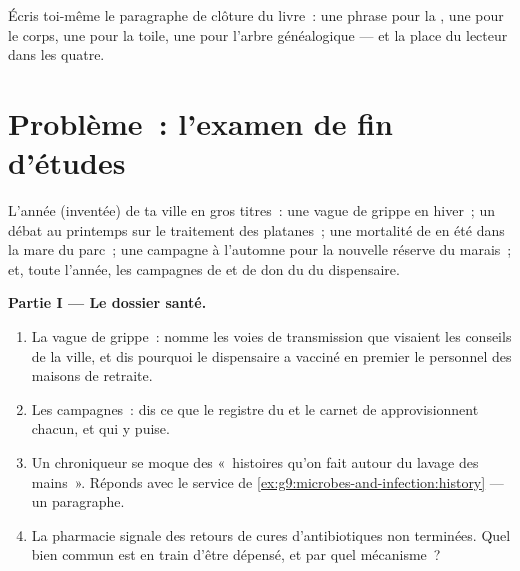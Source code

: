 \begin{exercise}[$\star\star\star$]\label{exo:g9:our-responsibility:12}
Écris toi-même le paragraphe de clôture du livre~: une
phrase pour la , une pour le corps, une pour la
toile, une pour l'arbre généalogique --- et la place du
lecteur dans les quatre.
\end{exercise}

\section{Problème~: l'examen de fin d'études}

\begin{problem}\label{pb:g9:our-responsibility:1}
L'année (inventée) de ta ville en gros titres~: une vague de
grippe en hiver~; un débat au printemps sur le traitement
des platanes~; une mortalité de  en été dans la mare
du parc~; une campagne à l'automne pour la nouvelle réserve
du marais~; et, toute l'année, les campagnes de 
et de don du  du dispensaire.

\medskip\noindent\textbf{Partie I --- Le dossier santé.}
\begin{enumerate}
  \item La vague de grippe~: nomme les voies de
        transmission que visaient les conseils de la ville,
        et dis pourquoi le dispensaire a vacciné en premier
        le personnel des maisons de retraite.
  \item Les campagnes~: dis ce que le registre du  et
        le carnet de  approvisionnent chacun, et
        qui y puise.
  \item Un chroniqueur se moque des «~histoires qu'on fait
        autour du lavage des mains~». Réponds avec le
        service de \cref{ex:g9:microbes-and-infection:history}
        --- un paragraphe.
  \item La pharmacie signale des retours de cures
        d'antibiotiques non terminées. Quel bien commun est
        en train d'être dépensé, et par quel mécanisme~?
\end{enumerate}


\end{problem}
